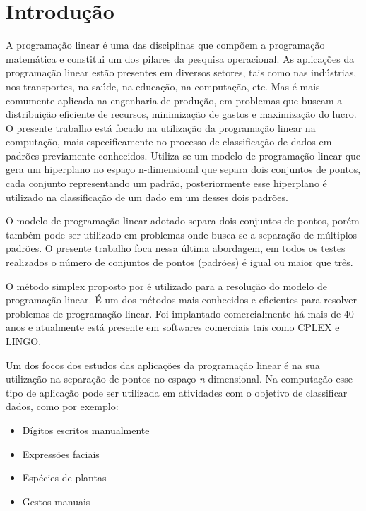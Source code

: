 \chapter{Introdução}

A programação linear é uma das disciplinas que compõem a programação matemática e constitui um dos pilares da pesquisa operacional. As aplicações da programação linear estão presentes em diversos setores, tais como nas indústrias, nos transportes, na saúde, na educação, na computação, etc. Mas é mais comumente aplicada na engenharia de produção, em problemas que buscam a distribuição eficiente de recursos, minimização de gastos e maximização do lucro. O presente trabalho está focado na utilização da programação linear na computação, mais especificamente no processo de classificação de dados em padrões previamente conhecidos. Utiliza-se um modelo de programação linear que gera um hiperplano no espaço n-dimensional que separa dois conjuntos de pontos, cada conjunto representando um padrão, posteriormente esse hiperplano é utilizado na classificação de um dado em um desses dois padrões. 

O modelo de programação linear adotado separa dois conjuntos de pontos, porém também pode ser utilizado em problemas onde busca-se a separação de múltiplos padrões. O presente trabalho foca nessa última abordagem, em todos os testes realizados o número de conjuntos de pontos (padrões) é igual ou maior que três.

O método simplex proposto por  é utilizado para a resolução do modelo de programação linear. É um dos métodos mais conhecidos e eficientes para resolver problemas de programação linear. Foi implantado comercialmente há mais de 40 anos e atualmente está presente em softwares comerciais tais como CPLEX e LINGO. 

Um dos focos dos estudos das aplicações da programação linear é na sua utilização na separação de pontos no espaço \textit{n}-dimensional. Na computação esse tipo de aplicação pode ser utilizada em atividades com o objetivo de classificar dados, como por exemplo:

\begin{itemize}
\item Dígitos escritos manualmente
\item Expressões faciais
\item Espécies de plantas
\item Gestos manuais
\end{itemize}


